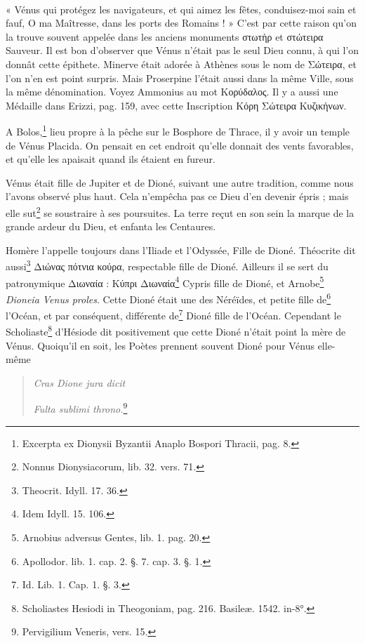 \documentclass[a4paper, 11pt, oneside, polutonikogreek, french]{article}
\begin{document}
\paragraph{}
« Vénus qui protégez les navigateurs, et qui aimez les fêtes, conduisez-moi sain et fauf, O ma Maîtresse, dans les ports des Romains ! » C'est par cette raison qu'on la trouve souvent appelée dans les anciens monuments στωτὴρ et στώτειρα Sauveur. Il est bon d'observer que Vénus n'était pas le seul Dieu connu, à qui l'on donnât cette épithete. Minerve était adorée à Athènes sous le nom de Σώτειρα, et l'on n'en est point surpris. Mais Proserpine l'était aussi dans la même Ville, sous la même dénomination. Voyez Ammonius au mot Κορύδαλος. Il y a aussi une Médaille dans Erizzi, pag. 159, avec cette Inscription Κόρη Σώτειρα Κυζικήνων.

A Bolos,\footnote{Excerpta ex Dionysii Byzantii Anaplo Bospori Thracii, pag. 8.} lieu propre à la pêche sur le Bosphore de Thrace, il y avoir un temple de Vénus Placida. On pensait en cet endroit qu'elle donnait des vents favorables, et qu'elle les apaisait quand ils étaient en fureur.

Vénus était fille de Jupiter et de Dioné, suivant une autre tradition, comme nous l'avons observé plus haut. Cela n'empêcha pas ce Dieu d'en devenir épris ; mais elle sut\footnote{Nonnus Dionysiacorum, lib. 32. vers. 71.} se soustraire à ses poursuites. La terre reçut en son sein la marque de la grande ardeur du Dieu, et enfanta les Centaures.

Homère l'appelle toujours dans l'Iliade et l'Odyssée, Fille de Dioné. Théocrite dit aussi\footnote{Theocrit. Idyll. 17. 36.} Διώνας πότνια κούρα, respectable fille de Dioné. Ailleurs il se sert du patronymique Διωναία : Κύπρι Διωναία\footnote{Idem Idyll. 15. 106.} Cypris fille de Dioné, et Arnobe\footnote{Arnobius adversus Gentes, lib. 1. pag. 20.} \emph{Dioneia Venus proles}. Cette Dioné était une des Néréïdes, et petite fille de\footnote{Apollodor. lib. 1. cap. 2. §. 7. cap. 3. §. 1.} l'Océan, et par conséquent, différente de\footnote{Id. Lib. 1. Cap. 1. §. 3.} Dioné fille de l'Océan. Cependant le Scholiaste\footnote{Scholiastes Hesiodi in Theogoniam, pag. 216. Basileæ. 1542. in-8°.} d'Hésiode dit positivement que cette Dioné n'était point la mère de Vénus. Quoiqu'il en soit, les Poètes prennent souvent Dioné pour Vénus elle-même
\begin{quotation}
\emph{Cras Dione jura dicit}

\hspace*{5mm}\emph{Fulta sublimi throno.}\footnote{Pervigilium Veneris, vers. 15.}
\end{quotation}
\end{document}
